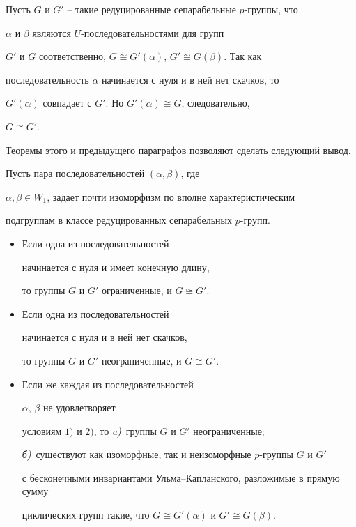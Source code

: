 \begin{pf}


Пусть $G$ и $G'$ -- такие редуцированные сепарабельные $p$-группы, что


$\alpha$ и $\beta$ являются $U$-последовательностями для групп


$G'$ и $G$ соответственно, $G\cong G'(\alpha)$, $G'\cong G(\beta)$. Так как


последовательность $\alpha$ начинается с нуля и в ней нет скачков, то


$G'(\alpha)$ совпадает с $G'$. Но $G'(\alpha)\cong G$, следовательно,


$G\cong G'$.


\end{pf}





Теоремы этого и предыдущего параграфов позволяют сделать следующий вывод.





\begin{thms}


Пусть пара последовательностей $(\alpha,\beta)$, где


$\alpha,\beta\in W_1$, задает почти изоморфизм по вполне характеристическим


подгруппам в классе редуцированных сепарабельных $p$-групп.


\begin{itemize}


\item[1)] Если одна из последовательностей


начинается с нуля и имеет конечную длину,


то группы $G$ и $G'$ ограниченные, и $G\cong G'$.


\item[2)] Если одна из последовательностей


начинается с нуля и в ней нет скачков,


то группы $G$ и $G'$ неограниченные, и $G\cong G'$.


\item[3)] Если же каждая из последовательностей


$\alpha$, $\beta$ не удовлетворяет


условиям $1)$ и $2)$, то {\em a)}~группы $G$ и $G'$ неограниченные\/$;$


{\em б)}~существуют как изоморфные, так и неизоморфные $p$-группы $G$ и $G'$


с бесконечными инвариантами Ульма--Капланского, разложимые в прямую сумму


циклических групп такие, что $G\cong G'(\alpha)$ и $G'\cong G(\beta)$.


\end{itemize}


\end{thms}





